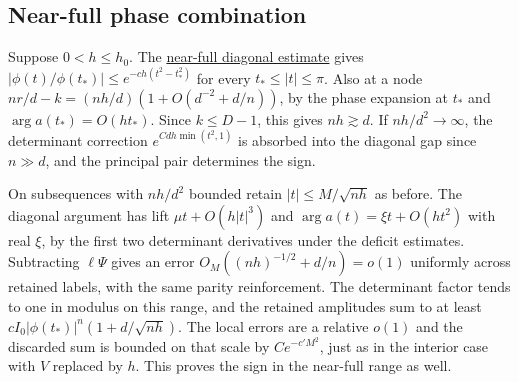 \subsection{Near-full phase combination}

Suppose $0<h\le h_0$. The \href{https://github.com/ProgramComputer/open-math-research/blob/4fb624ba937a8eecc1361a6066185cd81ab7b172/topics/balanced-arrays/quadratic/near-full-all-angular-signs.md}{near-full diagonal estimate} gives $|\phi(t)/\phi(t_*)|\le e^{-ch(t^2-t_*^2)}$ for every $t_*\le |t|\le\pi$. Also at a node $nr/d-k=(nh/d)(1+O(d^{-2}+d/n))$, by the phase expansion at $t_*$ and $\arg a(t_*)=O(ht_*)$. Since $k\le D-1$, this gives $nh\gtrsim d$. If $nh/d^2\to\infty$, the determinant correction $e^{Cdh\min(t^2,1)}$ is absorbed into the diagonal gap since $n\gg d$, and the principal pair determines the sign.

On subsequences with $nh/d^2$ bounded retain $|t|\le M/\sqrt{nh}$ as before. The diagonal argument has lift $\mu t+O(h|t|^3)$ and $\arg a(t)=\xi t+O(ht^2)$ with real $\xi$, by the first two determinant derivatives under the deficit estimates. Subtracting $\ell\Psi$ gives an error $O_M((nh)^{-1/2}+d/n)=o(1)$ uniformly across retained labels, with the same parity reinforcement. The determinant factor tends to one in modulus on this range, and the retained amplitudes sum to at least $c I_0|\phi(t_*)|^n(1+d/\sqrt{nh})$. The local errors are a relative $o(1)$ and the discarded sum is bounded on that scale by $C e^{-c'M^2}$, just as in the interior case with $V$ replaced by $h$. This proves the sign in the near-full range as well.
